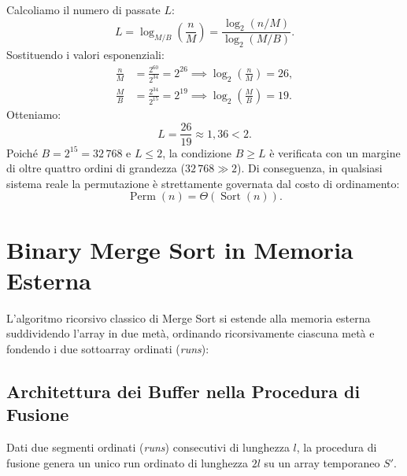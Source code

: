 Calcoliamo il numero di passate $L$:
\[
  L = \log_{M/B}\left(\frac{n}{M}\right) = \frac{\log_2(n / M)}{\log_2(M / B)}.
\]
Sostituendo i valori esponenziali:
\begin{align*}
  \frac{n}{M} &= \frac{2^{60}}{2^{34}} = 2^{26} \implies \log_2\left(\frac{n}{M}\right) = 26, \\
  \frac{M}{B} &= \frac{2^{34}}{2^{15}} = 2^{19} \implies \log_2\left(\frac{M}{B}\right) = 19.
\end{align*}
Otteniamo:
\[
  L = \frac{26}{19} \approx 1{,}36 < 2.
\]
Poiché $B = 2^{15} = 32\,768$ e $L \le 2$, la condizione $B \ge L$ è verificata con un margine di oltre quattro ordini di grandezza ($32\,768 \gg 2$). Di conseguenza, in qualsiasi sistema reale la permutazione è strettamente governata dal costo di ordinamento:
\[
  \operatorname{Perm}(n) = \Theta(\operatorname{Sort}(n)).
\]

\section{Binary Merge Sort in Memoria Esterna}
\label{sec:binary-merge-sort}

L'algoritmo ricorsivo classico di Merge Sort si estende alla memoria esterna suddividendo l'array in due metà, ordinando ricorsivamente ciascuna metà e fondendo i due sottoarray ordinati (\textit{runs}):

\begin{algorithm}[H]
  \DontPrintSemicolon
  \caption{Binary Merge Sort}
\end{algorithm}

\subsection{Architettura dei Buffer nella Procedura di Fusione}
\label{subsec:merge-procedure}

Dati due segmenti ordinati (\textit{runs}) consecutivi di lunghezza $l$, la procedura di fusione genera un unico run ordinato di lunghezza $2l$ su un array temporaneo $S'$.

